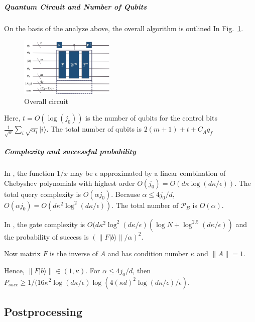 \documentclass[%
 reprint,
 amsmath,amssymb,
pra,
]{revtex4-1}
\begin{document}
\subparagraph{Quantum Circuit and Number of Qubits}
On the basis of the analyze above, the overall algorithm is outlined In Fig.~\ref{fig:o}.

\begin{figure}[htbp]
\centering
\includegraphics[width=0.4\textwidth]{Fig/overall}
\caption{Overall circuit}
\label{fig:o}
\end{figure}

Here, $t=O(\log(j_0))$ is the number of qubits for the control bits $\frac{1}{\sqrt{\alpha}} \sum_i\sqrt{\alpha_i}|i\rangle$. The total number of qubits is $2(m+1)+t+C_Aq_f$

\subparagraph{Complexity and successful probability}
In \cite{Childs2017Quantum}, the function $1/x$ may be $\epsilon$ approximated by a linear combination of Chebyshev polynomials with highest order $O(j_0)=O(d\kappa \log(d\kappa/\epsilon))$. The total query complexity is $O(\alpha j_0)$. Because $\alpha\leqslant 4j_0/d$, $O(\alpha j_0)=O(d\kappa^2\log^2(d\kappa/\epsilon))$. The total number of $\mathcal{P}_B$ is $O(\alpha)$.

In \cite{berry2015hamiltonian}, the gate complexity is $O(d\kappa^2\log^2(d\kappa/\epsilon) (\log N+\log^{2.5}(d\kappa/\epsilon))$ and the probability of success is $(\lVert F|b\rangle\rVert/\alpha)^2$. 

Now matrix $F$ is the inverse of $A$ and has condition number $\kappa$ and $\lVert A\rVert=1$. 

Hence, $\lVert F|b\rangle\rVert\in (1, \kappa)$. For $\alpha\leqslant4j_0/d$, then $P_{succ}\geqslant 1/(16\kappa^2 \log(d\kappa/\epsilon) \log(4(\kappa d)^2\log(d \kappa/\epsilon)/\epsilon)$.

\subsection{Postprocessing}
\end{document}
